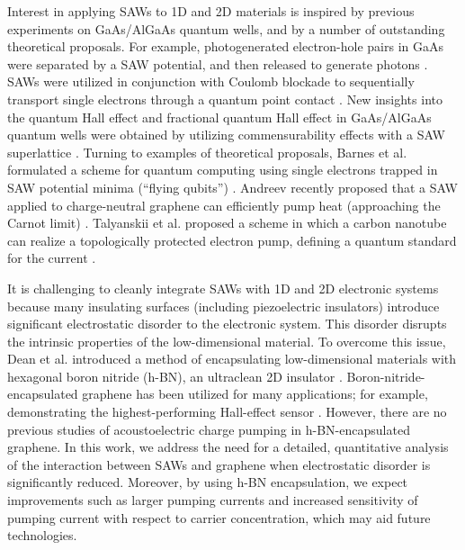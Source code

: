 \documentclass[double,12pt,1in,seploa]{beavtex}
\begin{document}
Interest in applying SAWs to 1D and 2D materials is inspired by previous experiments on GaAs/AlGaAs quantum wells, and by a number of outstanding theoretical proposals. For example, photogenerated electron-hole pairs in GaAs were separated by a SAW potential, and then released to generate photons \cite{rocke_acoustically_1997}. SAWs were utilized in conjunction with Coulomb blockade to sequentially transport single electrons through a quantum point contact \cite{talyanskii_single-electron_1997}. New insights into the quantum Hall effect and fractional quantum Hall effect in GaAs/AlGaAs quantum wells were obtained by utilizing commensurability effects with a SAW superlattice \cite{willett_experimental_1993,kukushkin_collective_2011}. Turning to examples of theoretical proposals, Barnes et al. formulated a scheme for quantum computing using single electrons trapped in SAW potential minima (“flying qubits”) \cite{barnes_quantum_2000,gumbs_quantum_2004,giavaras_quantum_2006}. Andreev recently proposed that a SAW applied to charge-neutral graphene can efficiently pump heat (approaching the Carnot limit) \cite{andreev_electronic_2022}. Talyanskii et al. proposed a scheme in which a carbon nanotube can realize a topologically protected electron pump, defining a quantum standard for the current \cite{talyanskii_quantized_2001}.

It is challenging to cleanly integrate SAWs with 1D and 2D electronic systems because many insulating surfaces (including piezoelectric insulators) introduce significant electrostatic disorder to the electronic system. This disorder disrupts the intrinsic properties of the low-dimensional material. To overcome this issue, Dean et al. introduced a method of encapsulating low-dimensional materials with hexagonal boron nitride (h-BN), an ultraclean 2D insulator \cite{dean_boron_2010}. Boron-nitride-encapsulated graphene has been utilized for many applications; for example, demonstrating the highest-performing Hall-effect sensor \cite{schaefer_magnetic_2020}. However, there are no previous studies of acoustoelectric charge pumping in h-BN-encapsulated graphene. In this work, we address the need for a detailed, quantitative analysis of the interaction between SAWs and graphene when electrostatic disorder is significantly reduced. Moreover, by using h-BN encapsulation, we expect improvements such as larger pumping currents and increased sensitivity of pumping current with respect to carrier concentration, which may aid future technologies. 
\end{document}
